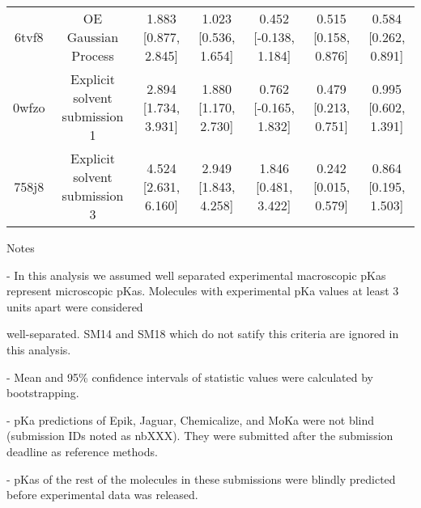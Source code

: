 \documentclass{article}
\begin{document}
\begin{center}
\begin{longtable}{|ccccccc|}
 6tvf8 &                                OE Gaussian Process &  1.883 [0.877, 2.845] &  1.023 [0.536, 1.654] &    0.452 [-0.138, 1.184] &  0.515 [0.158, 0.876] &  0.584 [0.262, 0.891] \\
 0wfzo &                      Explicit solvent submission 1 &  2.894 [1.734, 3.931] &  1.880 [1.170, 2.730] &    0.762 [-0.165, 1.832] &  0.479 [0.213, 0.751] &  0.995 [0.602, 1.391] \\
 758j8 &                      Explicit solvent submission 3 &  4.524 [2.631, 6.160] &  2.949 [1.843, 4.258] &     1.846 [0.481, 3.422] &  0.242 [0.015, 0.579] &  0.864 [0.195, 1.503] \\
\end{longtable}
\end{center}

Notes

- In this analysis we assumed well separated experimental macroscopic pKas represent microscopic pKas. Molecules with experimental pKa values at least 3 units apart were considered

well-separated. SM14 and SM18 which do not satify this criteria are ignored in this analysis.

- Mean and 95\% confidence intervals of statistic values were calculated by bootstrapping.

- pKa predictions of Epik, Jaguar, Chemicalize, and MoKa were not blind (submission IDs noted as nbXXX). They were submitted after the submission deadline as reference methods.

- pKas of the rest of the molecules in these submissions were blindly predicted before experimental data was released.
\end{document}
